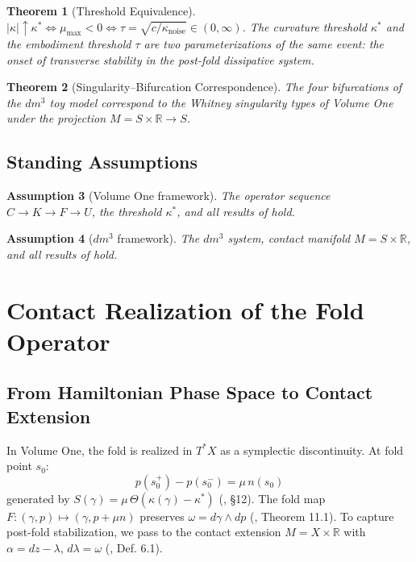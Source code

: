 \documentclass[11pt]{article}
\theoremstyle{boxed}
\newtheorem{theorem}{Theorem}[section]
\newtheorem{assumption}[theorem]{Assumption}
\begin{document}
\begin{theorem}[Threshold Equivalence]\label{thm:B}
$|\kappa| \uparrow \kappa^{*} \iff \mu_{\max} < 0 \iff \tau = \sqrt{c/\kappa_{\mathrm{noise}}} \in (0,\infty)$.
The curvature threshold $\kappa^{*}$ and the embodiment threshold $\tau$ are two
parameterizations of the same event: the onset of transverse stability in the
post-fold dissipative system.
\end{theorem}

\begin{theorem}[Singularity--Bifurcation Correspondence]\label{thm:C}
The four bifurcations of the $dm^3$ toy model \cite{dm3} correspond to the Whitney
singularity types of Volume One under the projection $M = S \times \mathbb{R} \to S$.
\end{theorem}

\subsection{Standing Assumptions}

\begin{assumption}[Volume One framework]
The operator sequence $C \to K \to F \to U$, the threshold $\kappa^{*}$, and all
results of \cite{VolI} hold.
\end{assumption}

\begin{assumption}[$dm^3$ framework]
The $dm^3$ system, contact manifold $M = S \times \mathbb{R}$, and all results
of \cite{GCM,dm3} hold.
\end{assumption}

\section{Contact Realization of the Fold Operator}

\subsection{From Hamiltonian Phase Space to Contact Extension}

In Volume One, the fold is realized in $T^{*}X$ as a symplectic discontinuity. At
fold point $s_0$:
\[
  p(s_0^{+}) - p(s_0^{-}) = \mu\, n(s_0)
\]
generated by $S(\gamma) = \mu\, \Theta(\kappa(\gamma) - \kappa^{*})$
(\cite{VolI}, \S 12). The fold map $F : (\gamma, p) \mapsto (\gamma, p + \mu n)$
preserves $\omega = d\gamma \wedge dp$ (\cite{VolI}, Theorem 11.1). To capture
post-fold stabilization, we pass to the contact extension $M = X \times \mathbb{R}$
with $\alpha = dz - \lambda$, $d\lambda = \omega$ (\cite{GCM}, Def. 6.1).
\end{document}
